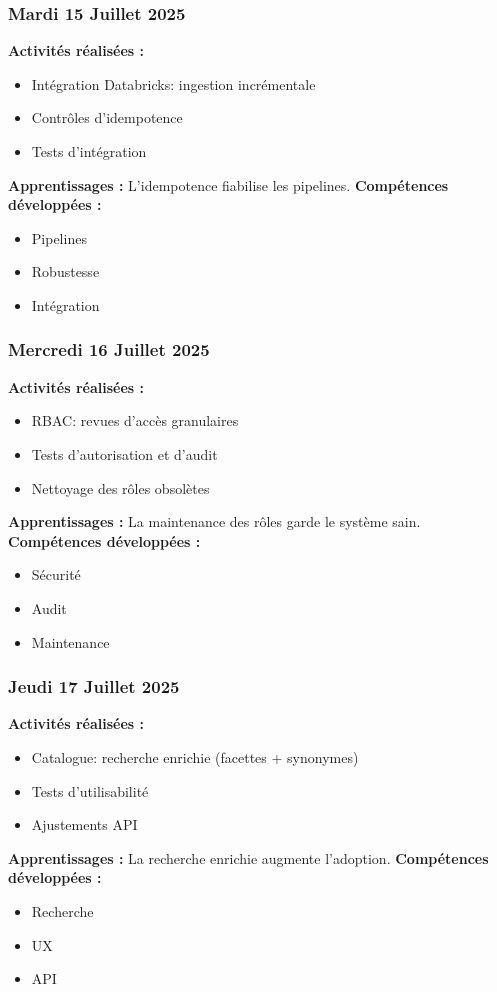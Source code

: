 \documentclass[12pt,a4paper]{article}
\begin{document}
\subsubsection{Mardi 15 Juillet 2025}
\textbf{Activités réalisées :}
\begin{itemize}
    \item Intégration Databricks: ingestion incrémentale
    \item Contrôles d'idempotence
    \item Tests d'intégration
\end{itemize}
\textbf{Apprentissages :} L'idempotence fiabilise les pipelines.
\textbf{Compétences développées :}
\begin{itemize}
    \item Pipelines
    \item Robustesse
    \item Intégration
\end{itemize}

\subsubsection{Mercredi 16 Juillet 2025}
\textbf{Activités réalisées :}
\begin{itemize}
    \item RBAC: revues d'accès granulaires
    \item Tests d'autorisation et d'audit
    \item Nettoyage des rôles obsolètes
\end{itemize}
\textbf{Apprentissages :} La maintenance des rôles garde le système sain.
\textbf{Compétences développées :}
\begin{itemize}
    \item Sécurité
    \item Audit
    \item Maintenance
\end{itemize}

\subsubsection{Jeudi 17 Juillet 2025}
\textbf{Activités réalisées :}
\begin{itemize}
    \item Catalogue: recherche enrichie (facettes + synonymes)
    \item Tests d'utilisabilité
    \item Ajustements API
\end{itemize}
\textbf{Apprentissages :} La recherche enrichie augmente l'adoption.
\textbf{Compétences développées :}
\begin{itemize}
    \item Recherche
    \item UX
    \item API
\end{itemize}
\end{document}
